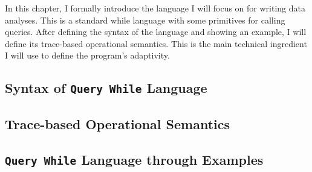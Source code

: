 In this chapter, 
I formally introduce the language I will focus on for writing data analyses.  
This is a standard while language with some primitives for calling queries. 
After defining the syntax of the language and showing an example, 
I will define its trace-based operational semantics. 
This is the main technical ingredient I will use to define the program's adaptivity.
\subsection{Syntax of {\tt Query While} Language}
\label{sec:language-syntax}

\subsection{Trace-based Operational Semantics}
\label{sec:language-os}


\subsection{{\tt Query While} Language through Examples}
\label{sec:language-examples}

